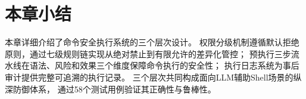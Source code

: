 \section{本章小结}

本章详细介绍了命令安全执行系统的三个层次设计。
权限分级机制遵循默认拒绝原则，通过七级规则链实现从绝对禁止到有限允许的差异化管控；
预执行三步流水线在语法、风险和效果三个维度保障命令执行的安全性；
执行日志系统为事后审计提供完整可追溯的执行记录。
三个层次共同构成面向LLM辅助Shell场景的纵深防御体系，
通过58个测试用例验证其正确性与鲁棒性。


